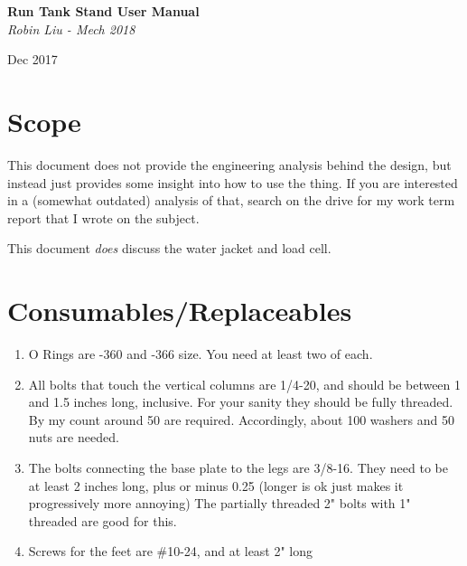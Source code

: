 \documentclass[11pt]{article}
\begin{document}
\begin{titlepage}
   \begin{center}
      \Large\textbf{Run Tank Stand User Manual}\\
      \large\textit{Robin Liu - Mech 2018}
      
      Dec 2017
   \end{center}
\end{titlepage}

\section{Scope}
This document does not provide the engineering analysis behind the design, but instead just provides some insight into how to use the thing. If you are interested in a (somewhat outdated) analysis of that, search on the drive for my work term report that I wrote on the subject.

This document \textit{does} discuss the water jacket and load cell.

\section{Consumables/Replaceables}
\begin{enumerate}
	\item O Rings are -360 and -366 size. You need at least two of each.
	\item All bolts that touch the vertical columns are 1/4-20, and should be between 1 and 1.5 inches long, inclusive. For your sanity they should be fully threaded. By my count around 50 are required. Accordingly, about 100 washers and 50 nuts are needed.
	\item The bolts connecting the base plate to the legs are 3/8-16. They need to be at least 2 inches long, plus or minus 0.25 (longer is ok just makes it progressively more annoying) The partially threaded 2" bolts with 1" threaded are good for this.
	\item Screws for the feet are \#10-24, and at least 2" long
\end{enumerate}
\end{document}
